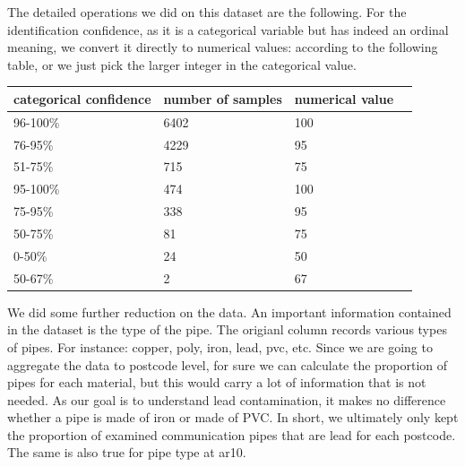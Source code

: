 \documentclass[11pt,twoside]{article}
\numberwithin{Theorem}{section}
\numberwithin{Definition}{section}
\numberwithin{Lemma}{section}
\numberwithin{Algorithm}{section}
\numberwithin{equation}{section}
\begin{document}
The detailed operations we did on this dataset are the following. For the identification confidence, as it is a categorical variable but has indeed an ordinal meaning, we convert it directly to numerical values: according to the following table, or we just pick the larger integer in the categorical value.
\begin{center}
    \begin{tabular}{lllc}
        \hline
        categorical confidence  & number of samples & numerical value\\
        \hline
        96-100\%  & 6402   &   100\\
        \hline
        76-95\%   & 4229   &   95\\
        \hline
        51-75\%   &  715   &   75\\
        \hline
        95-100\%  &  474   &   100\\
        \hline
        75-95\%   &  338   &   95\\
        \hline
        50-75\%   &   81   &   75\\
        \hline
        0-50\%    &   24   &   50\\
        \hline
        50-67\%   &    2   &   67\\
        \hline
    \end{tabular}
\end{center}
We did some further reduction on the data. An important information contained in the dataset is the type of the pipe. The origianl column records various types of pipes. For instance: copper, poly, iron, lead, pvc, etc. Since we are going to aggregate the data to postcode level, for sure we can calculate the proportion of pipes for each material, but this would carry a lot of information that is not needed. As our goal is to understand lead contamination, it makes no difference whether a pipe is made of iron or made of PVC. In short, we ultimately only kept the proportion of examined communication pipes that are lead for each postcode. The same is also true for pipe type at ar10.
\end{document}
